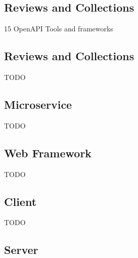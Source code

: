 \documentclass[conference]{IEEEtran}
\begin{document}
\subsection{Reviews and Collections}

15 OpenAPI Tools and frameworks \cite{www-python-rest-best}





\subsection{Reviews and Collections}

\begin{description}

\item[TODO]

\end{description}

\subsection{Microservice}

\begin{description}

\item[TODO]

\end{description}

\subsection{Web Framework}

\begin{description}

\item[TODO]

\end{description}

\subsection{Client}

\begin{description}

\item[TODO]

\end{description}

\subsection{Server}
\end{document}
